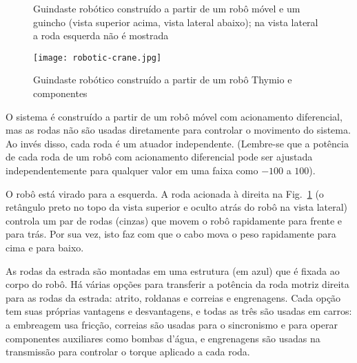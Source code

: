 \begin{figure}
\begin{center}
\caption{Guindaste robótico construído a partir de um robô móvel e um guincho (vista superior acima, vista lateral abaixo); na vista lateral a roda esquerda não é mostrada}\label{fig.act-dof}
\end{center}
\end{figure}

\begin{figure}
\begin{center}
\texttt{[image: robotic-crane.jpg]}
\caption{Guindaste robótico construído a partir de um robô Thymio e componentes \lego}\label{fig.crane}
\end{center}
\end{figure}

O sistema é construído a partir de um robô móvel com acionamento diferencial, mas as rodas não são usadas diretamente para controlar o movimento do sistema. Ao invés disso, cada roda é um atuador independente. (Lembre-se que a potência de cada roda de um robô com acionamento diferencial pode ser ajustada independentemente para qualquer valor em uma faixa como $-100$ a $100$).

O robô está virado para a esquerda. A roda acionada à direita na Fig.~\ref{fig.act-dof} (o retângulo preto no topo da vista superior e oculto atrás do robô na vista lateral) controla um par de rodas (cinzas) que movem o robô rapidamente para frente e para trás. Por sua vez, isto faz com que o cabo mova o peso rapidamente para cima e para baixo.

As rodas da estrada são montadas em uma estrutura (em azul) que é fixada ao corpo do robô. Há várias opções para transferir a potência da roda motriz direita para as rodas da estrada: atrito, roldanas e correias e engrenagens. Cada opção tem suas próprias vantagens e desvantagens, e todas as três são usadas em carros: a embreagem usa fricção, correias são usadas para o sincronismo e para operar componentes auxiliares como bombas d'água, e engrenagens são usadas na transmissão para controlar o torque aplicado a cada roda.

